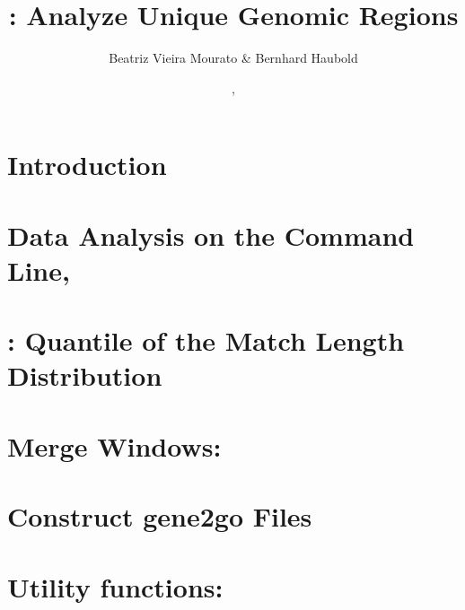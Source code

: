 \documentclass[a4paper]{report}
\begin{document}
\pagestyle{noweb}

\title{: Analyze Unique Genomic Regions}
\author{Beatriz Vieira Mourato \& Bernhard Haubold}
\date{\hspace{-3pt}, }
\maketitle

\tableofcontents

\chapter{Introduction}

\chapter{Data Analysis on the Command Line, }\label{ch:cli}

\chapter{: Quantile of the Match Length Distribution}\label{ch:man}

\chapter{Merge Windows: }\label{ch:me}

\chapter{Construct gene2go Files}\label{ch:g2g}

\chapter{Utility functions: }\label{ch:uti}



\end{document}

